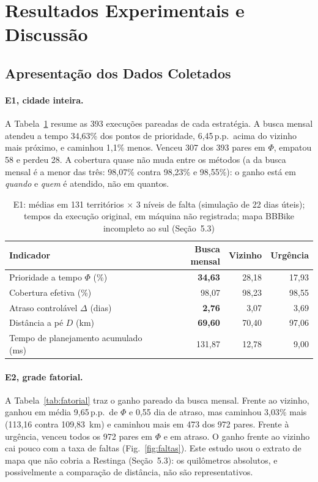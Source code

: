 \documentclass[11pt,a4paper]{article}
\newcommand{\pp}{\,p.p.}
\begin{document}
\section{Resultados Experimentais e Discussão}

\subsection{Apresentação dos Dados Coletados}

\paragraph{E1, cidade inteira.} A Tabela~\ref{tab:cidade} resume as 393 execuções pareadas de cada estratégia. A busca mensal atendeu a tempo 34,63\% dos pontos de prioridade, 6,45\pp\ acima do vizinho mais próximo, e caminhou 1,1\% menos. Venceu 307 dos 393 pares em $\Phi$, empatou 58 e perdeu 28. A cobertura quase não muda entre os métodos (a da busca mensal é a menor das três: 98,07\% contra 98,23\% e 98,55\%): o ganho está em \emph{quando} e \emph{quem} é atendido, não em quantos.

\begin{table}[ht]
\centering
\caption{E1: médias em 131 territórios $\times$ 3 níveis de falta (simulação de 22 dias úteis); tempos da execução original, em máquina não registrada; mapa BBBike incompleto ao sul (Seção~5.3)}
\label{tab:cidade}
\begin{tabular}{@{}lrrr@{}}
\toprule
\textbf{Indicador} & \textbf{Busca mensal} & \textbf{Vizinho} & \textbf{Urgência} \\
\midrule
Prioridade a tempo $\Phi$ (\%) & \textbf{34,63} & 28,18 & 17,93 \\
Cobertura efetiva (\%) & 98,07 & 98,23 & 98,55 \\
Atraso controlável $\Delta$ (dias) & \textbf{2,76} & 3,07 & 3,69 \\
Distância a pé $D$ (km) & \textbf{69,60} & 70,40 & 97,06 \\
Tempo de planejamento acumulado (ms) & 131,87 & 12,78 & 9,00 \\
\bottomrule
\end{tabular}
\end{table}

\paragraph{E2, grade fatorial.} A Tabela~\ref{tab:fatorial} traz o ganho pareado da busca mensal. Frente ao vizinho, ganhou em média 9,65\pp\ de $\Phi$ e 0,55 dia de atraso, mas caminhou 3,03\% mais (113,16 contra 109,83~km) e caminhou mais em 473 dos 972 pares. Frente à urgência, venceu todos os 972 pares em $\Phi$ e em atraso. O ganho frente ao vizinho cai pouco com a taxa de faltas (Fig.~\ref{fig:faltas}). Este estudo usou o extrato de mapa que não cobria a Restinga (Seção~5.3): os quilômetros absolutos, e possivelmente a comparação de distância, não são representativos.
\end{document}
